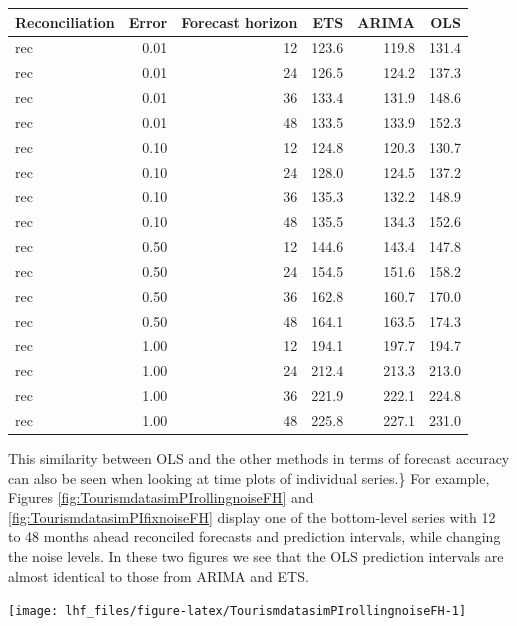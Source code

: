 \documentclass[11pt,a4paper,]{article}
\let\origfigure\figure
\let\endorigfigure\endfigure
\renewenvironment{figure}[1][2] {
    \expandafter\origfigure\expandafter[!htbp]
} {
    \endorigfigure
}
\let\origtable\table
\let\endorigtable\endtable
\renewenvironment{table}[1][2] {
    \expandafter\origtable\expandafter[!htbp]
} {
    \endorigtable
}
\begin{document}
\begin{table}[!h]

\caption{\label{tab:TourismdatasimfixnoiseFH}Mean RMSE of fixed origin forecasts for simulated data (304 bottom-level series and 8 levels of hierarchy), for different error levels, methods (ETS, ARIMA, OLS), forecast horizons, with reconciliation.}
\centering
\begin{tabular}[t]{lrrrrr}
\toprule
Reconciliation & Error & Forecast horizon & ETS & ARIMA & OLS\\
\midrule
rec & 0.01 & 12 & 123.6 & 119.8 & 131.4\\
rec & 0.01 & 24 & 126.5 & 124.2 & 137.3\\
rec & 0.01 & 36 & 133.4 & 131.9 & 148.6\\
rec & 0.01 & 48 & 133.5 & 133.9 & 152.3\\
rec & 0.10 & 12 & 124.8 & 120.3 & 130.7\\
rec & 0.10 & 24 & 128.0 & 124.5 & 137.2\\
rec & 0.10 & 36 & 135.3 & 132.2 & 148.9\\
rec & 0.10 & 48 & 135.5 & 134.3 & 152.6\\
rec & 0.50 & 12 & 144.6 & 143.4 & 147.8\\
rec & 0.50 & 24 & 154.5 & 151.6 & 158.2\\
rec & 0.50 & 36 & 162.8 & 160.7 & 170.0\\
rec & 0.50 & 48 & 164.1 & 163.5 & 174.3\\
rec & 1.00 & 12 & 194.1 & 197.7 & 194.7\\
rec & 1.00 & 24 & 212.4 & 213.3 & 213.0\\
rec & 1.00 & 36 & 221.9 & 222.1 & 224.8\\
rec & 1.00 & 48 & 225.8 & 227.1 & 231.0\\
\bottomrule
\end{tabular}
\end{table}

This similarity between OLS and the other methods in terms of forecast accuracy can also be seen when looking at time plots of individual series.\} For example, Figures \ref{fig:TourismdatasimPIrollingnoiseFH} and \ref{fig:TourismdatasimPIfixnoiseFH} display one of the bottom-level series with 12 to 48 months ahead reconciled forecasts and prediction intervals, while changing the noise levels. In these two figures we see that the OLS prediction intervals are almost identical to those from ARIMA and ETS.

\begin{figure}

{\centering \texttt{[image: lhf\_files/figure-latex/TourismdatasimPIrollingnoiseFH-1]} 

}

\caption{Comparing reconciled 'rolling origin' forecasts and prediction intervals for a sample bottom-level series across different error levels (different panels).}\label{fig:TourismdatasimPIrollingnoiseFH}
\end{figure}
\end{document}
